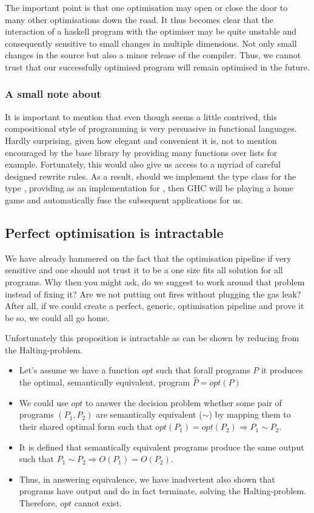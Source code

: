The important point is that one optimisation may open or close the door to many other
optimisations down the road. It thus becomes clear that the interaction of a haskell program
with the optimiser may be quite unstable and consequently sensitive to small changes in
multiple dimensions. Not only small changes in the source but also a minor release of
the compiler. Thus, we cannot trust that our successfully optimised program will remain
optimised in the future.

\subsubsection{A small note about }

It is important to mention that even though  seems a little contrived,
this compositional style of programming is very persuasive in functional languages.
Hardly surprising, given how elegant and convenient it is, not to mention encouraged
by the base library by providing many functions over lists for example. Fortunately,
this would also give us access to a myriad of careful designed rewrite rules. As a result,
should we implement the  type class for the type , providing
 as an implementation for , then GHC will be playing a home game 
and automatically fuse the subsequent  applications for us.

\subsection{Perfect optimisation is intractable}

We have already hammered on the fact that the optimisation pipeline if very sensitive
and one should not trust it to be a one size fits all solution for all programs. Why
then you might ask, do we suggest to work around that problem instead of fixing it?
Are we not putting out fires without plugging the gas leak? After all, if we could
create a perfect, generic, optimisation pipeline and prove it be so, we could all
go home.

Unfortunately this proposition is intractable as can be shown by reducing from the
Halting-problem.

\begin{itemize}
  \item Let's assume we have a function $opt$ such that forall programs $P$ it produces the optimal, semantically equivalent, program $\hat{P} = opt(P)$
  \item We could use $opt$ to answer the decision problem whether some pair of programs $(P_{1}, P_{2})$ are semantically equivalent ($\sim$) by mapping them to their
    shared optimal form such that $opt(P_{1}) = opt(P_{2}) \Rightarrow P_{1} \sim P_{2}$.
  \item It is defined that semantically equivalent programs produce the same output such that $P_{1} \sim P_{2} \Rightarrow O(P_{1}) = O(P_{2})$.
  \item Thus, in answering equivalence, we have inadvertent also shown that programs have output and do in fact terminate, solving the Halting-problem.
    Therefore, $opt$ cannot exist.
\end{itemize}

